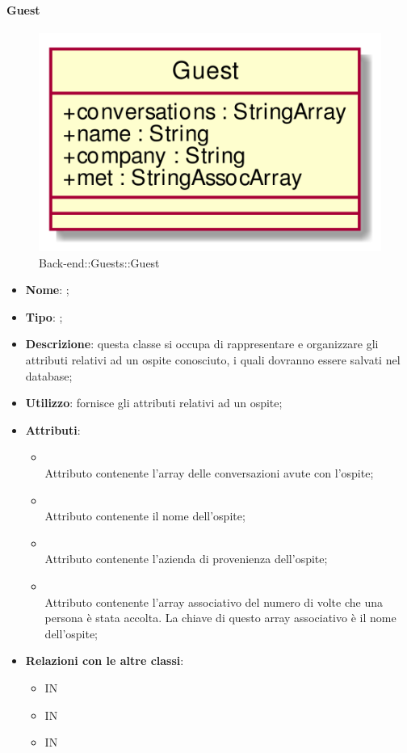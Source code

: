 \hypertarget{Guest_label}{\paragraph{Guest}}
\begin{figure}[h]
	\centering
	\includegraphics[width=\textwidth,height=\textheight,keepaspectratio]{images/ClassGuest.png}
	\caption{Back-end::Guests::Guest}
\end{figure}
\begin{itemize}
	\item \textbf{Nome}: ;
	\item \textbf{Tipo}: ;
	\item \textbf{Descrizione}: questa classe si occupa di rappresentare e organizzare gli attributi relativi ad un ospite conosciuto, i quali dovranno essere salvati nel database;
	\item \textbf{Utilizzo}: fornisce gli attributi relativi ad un ospite;
	\item \textbf{Attributi}:
	\begin{itemize}
		\item[]  \\
		Attributo contenente l'array delle conversazioni avute con l'ospite;
		\item[]  \\
		Attributo contenente il nome dell'ospite;
		\item[]  \\
		Attributo contenente l'azienda di provenienza dell'ospite;
		\item[]  \\
		Attributo contenente l'array associativo del numero di volte che una persona è stata accolta. La chiave di questo array associativo è il nome dell'ospite;
	\end{itemize}
	\item \textbf{Relazioni con le altre classi}:
	\begin{itemize}
		\item IN \hyperlink{<<interface>> GuestsDAO_label}{}
		\item IN \hyperlink{GuestObserver_label}{}
		\item IN \hyperlink{GuestsDAODynamoDB_label}{}
	\end{itemize}
\end{itemize}
